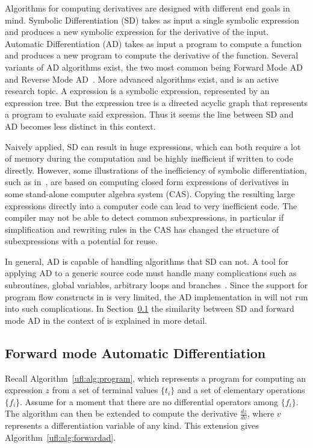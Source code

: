 Algorithms for computing derivatives are designed with different end
goals in mind.  Symbolic Differentiation (SD) takes as input a single
symbolic expression and produces a new symbolic expression for the
derivative of the input.  Automatic Differentiation (AD) takes as
input a program to compute a function and produces a new program to
compute the derivative of the function.  Several variants of AD
algorithms exist, the two most common being Forward Mode AD and
Reverse Mode AD~\cite{Gri1989}.  More advanced algorithms exist, and
is an active research topic. A \ufl{} expression
is a symbolic expression, represented by an expression tree. But the
expression tree is a directed acyclic graph that represents a program
to evaluate said expression.  Thus it seems the line between SD and AD
becomes less distinct in this context.

Naively applied, SD can result in huge expressions, which can both
require a lot of memory during the computation and be highly
inefficient if written to code directly. However, some illustrations
of the inefficiency of symbolic differentiation, such as
in~\cite{Gri1989}, are based on computing closed form expressions of
derivatives in some stand-alone computer algebra system (CAS).
Copying the resulting large expressions directly into a computer code
can lead to very inefficient code. The compiler may not be able to
detect common subexpressions, in particular if simplification and
rewriting rules in the CAS has changed the structure of subexpressions
with a potential for reuse.

In general, AD is capable of handling algorithms that SD can not.  A
tool for applying AD to a generic source code must handle many
complications such as subroutines, global variables, arbitrary loops
and branches~\cite{BisCar1992,BisHov2002,GieKam1998}.  Since the
support for program flow constructs in \ufl{} is very limited, the AD
implementation in \ufl{} will not run into such complications.  In
Section~\ref{ufl:sec:forwardad} the similarity between SD and forward
mode AD in the context of \ufl{} is explained in more detail.

\subsection{Forward mode Automatic Differentiation}
\label{ufl:sec:forwardad}

Recall Algorithm~\ref{ufl:alg:program}, which represents a program for
computing an expression $z$ from a set of terminal values $\{ t_i \}$
and a set of elementary operations $\{ f_i \}$. Assume for a moment
that there are no differential operators among $\{ f_i \}$.  The
algorithm can then be extended to compute the derivative $\frac{d z}{d
  v}$, where $v$ represents a differentiation variable of any kind.
This extension gives Algorithm~\ref{ufl:alg:forwardad}.

